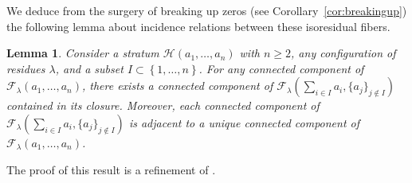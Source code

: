 \documentclass[JEP,XML,SOM,Unicode,NoFloatCountersInSection,published]{cedram}
\newtheorem{lem}[thm]{Lemma}
\theoremstyle{definition}
\begin{document}
We deduce from the surgery of breaking up zeros (see Corollary~\ref{cor:breakingup}) the following lemma about incidence relations between these isoresidual fibers.

\begin{lem}\label{lem:incidence}
Consider a stratum $\mathcal{H}(a_{1},\dots,a_{n})$ with $n \geq 2$, any configuration of residues $\lambda$, and a subset $I\subset \left\{1,\dots,n\right\}$. For any connected component of $\mathcal{F}_{\lambda}(a_{1},\dots,a_{n})$, there exists a connected component of $\mathcal{F}_{\lambda}(\sum_{i\in I} a_{i},\lbrace a_{j}\rbrace_{j\notin I})$ contained in its closure. Moreover, each connected component of $\mathcal{F}_{\lambda}(\sum_{i\in I} a_{i},\lbrace a_{j}\rbrace_{j\notin I})$ is adjacent to a unique connected component of $\mathcal{F}_{\lambda}(a_{1},\dots,a_{n})$.
\end{lem}

The proof of this result is a refinement of \cite[Prop.\,7.1 \&~7.2]{Bo}.
\end{document}
